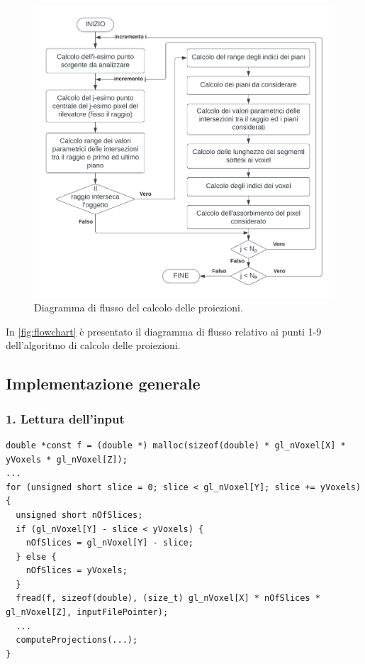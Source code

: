 \documentclass[12pt,a4paper]{report}
\begin{document}
\begin{figure}[H]
  \centering
  \includegraphics[width=\textwidth]{flowchart}
  \caption{Diagramma di flusso del calcolo delle proiezioni.}
  \label{fig:flowchart}
\end{figure}

In \autoref{fig:flowchart} è presentato il diagramma di flusso relativo ai punti 1-9 dell'algoritmo di calcolo delle proiezioni.

\subsection{Implementazione generale}

\subsubsection{1. Lettura dell'input}

\begin{lstlisting}[language=CStyle, caption={Codice C per la lettura di \(f\).}, label={lst:vector_f_read}]
double *const f = (double *) malloc(sizeof(double) * gl_nVoxel[X] * yVoxels * gl_nVoxel[Z]);
...
for (unsigned short slice = 0; slice < gl_nVoxel[Y]; slice += yVoxels) {
  unsigned short nOfSlices;
  if (gl_nVoxel[Y] - slice < yVoxels) {
    nOfSlices = gl_nVoxel[Y] - slice;
  } else {
    nOfSlices = yVoxels;
  }
  fread(f, sizeof(double), (size_t) gl_nVoxel[X] * nOfSlices * gl_nVoxel[Z], inputFilePointer);
  ...
  computeProjections(...);
}
\end{lstlisting}
\end{document}
